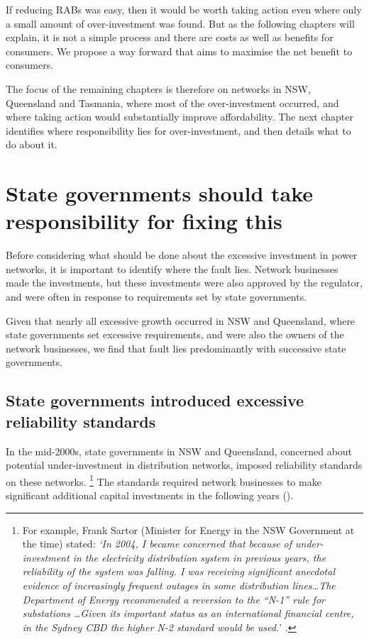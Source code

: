 \documentclass[FrontPage]{grattan}
\begin{document}
If reducing RABs was easy, then it would be worth taking action even where only a small amount of over-investment was found. But as the following chapters will explain, it is not a simple process and there are costs as well as benefits for consumers. We propose a way forward that aims to maximise the net benefit to consumers. 

The focus of the remaining chapters is therefore on networks in NSW, Queensland and Tasmania, where most of the over-investment occurred, and where taking action would substantially improve affordability. The next chapter identifies where responsibility lies for over-investment, and then  details what to do about it.


\chapter{State governments should take responsibility for fixing this}\label{chap:whose-fault}

Before considering what should be done about the excessive investment in power networks, it is important to identify where the fault lies. Network businesses made the investments, but these investments were also approved by the regulator, and were often in response to requirements set by state governments. 

Given that nearly all excessive growth occurred in NSW and Queensland, where state governments set excessive requirements, and were also the owners of the network businesses, we find that fault lies predominantly with successive state governments.

\section{State governments introduced excessive reliability standards}\label{sec:state-governments-introduced-excessive-reliability-standards}
In the mid-2000s, state governments in NSW and Queensland, concerned about potential under-investment in distribution networks, imposed reliability standards on these networks.%
\footnote{For example, Frank Sartor (Minister for Energy in the NSW Government at the time) stated: \emph{`In 2004, I became concerned that because of under-investment in the electricity distribution system in previous years, the reliability of the system was falling. I was receiving significant anecdotal evidence of increasingly frequent outages in some distribution lines\dots The Department of Energy recommended a reversion to the ``N-1'' rule for substations \dots Given its important status as an international financial centre, in the Sydney CBD the higher N-2 standard would be used.}' \textcite{sartor2011fog}.}
The standards required network businesses to make significant additional capital investments in the following years (). 
\end{document}
